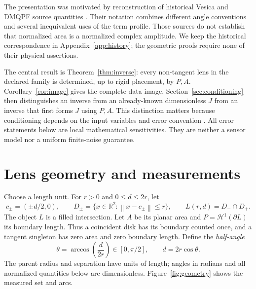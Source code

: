 \documentclass[11pt,a4paper]{article}
\theoremstyle{definition}
\newcommand{\R}{\mathbb R}
\newcommand{\norm}[1]{\left\lVert#1\right\rVert}
\begin{document}
The presentation was motivated by reconstruction of historical Vesica and DMQPF source quantities \citep{vd,vpqw,dmqpfref}. Their notation combines different angle conventions and several inequivalent uses of the term profile. Those sources do not establish that normalized area is a normalized complex amplitude. We keep the historical correspondence in Appendix~\ref{app:history}; the geometric proofs require none of their physical assertions.

The central result is Theorem~\ref{thm:inverse}: every non-tangent lens in the declared family is determined, up to rigid placement, by \(P,A\). Corollary~\ref{cor:image} gives the complete data image. Section~\ref{sec:conditioning} then distinguishes an inverse from an already-known dimensionless \(J\) from an inverse that first forms \(J\) using \(P,A\). This distinction matters because conditioning depends on the input variables and error convention \citep{higham}. All error statements below are local mathematical sensitivities. They are neither a sensor model nor a uniform finite-noise guarantee.

\section{Lens geometry and measurements}\label{sec:geometry}
Choose a length unit. For \(r>0\) and \(0\le d\le 2r\), let
\begin{equation}\label{eq:disks}
 c_\pm=(\pm d/2,0),\qquad
 D_\pm=\{x\in\R^2:\norm{x-c_\pm}\le r\},\qquad
 L(r,d)=D_-\cap D_+ .
\end{equation}
The object \(L\) is a filled intersection. Let \(A\) be its planar area and \(P=\mathcal H^1(\partial L)\) its boundary length. Thus a coincident disk has its boundary counted once, and a tangent singleton has zero area and zero boundary length. Define the \emph{half-angle}
\begin{equation}\label{eq:theta}
 \theta=\arccos\!\left(\frac d{2r}\right)\in[0,\pi/2],
 \qquad d=2r\cos\theta .
\end{equation}
The parent radius and separation have units of length; angles in radians and all normalized quantities below are dimensionless. Figure~\ref{fig:geometry} shows the measured set and arcs.
\end{document}
